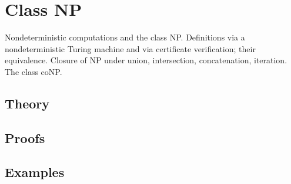 
\section{Class NP}
\label{sec:2.3a.11-class-np}

\begin{ticket}
Nondeterministic computations and the class NP. Definitions via a nondeterministic Turing machine and via certificate verification; their equivalence. Closure of NP under union, intersection, concatenation, iteration. The class coNP.
\end{ticket}

\subsection*{Theory}

\subsection*{Proofs}

\subsection*{Examples}
